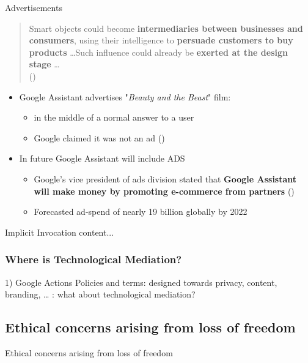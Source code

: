 \documentclass{beamer}
\begin{document}
\begin{frame}[allowframebreaks]
\begin{block}{Advertisements}
	\bigskip
	\begin{quote}
		Smart objects could become
\textbf{intermediaries between businesses and consumers}, using their intelligence to \textbf{persuade customers to buy products} \dots Such influence could
already be \textbf{exerted at the design stage} \dots\\(\cite{brey2005freedom})
	\end{quote}

	\begin{itemize}
		\item Google Assistant advertises "\emph{Beauty and the Beast}" film:
			\begin{itemize}
				\item in the middle of a normal answer to a user
				\item Google claimed it was not an ad (\cite{androidPolice})
			\end{itemize}
		\item In future Google Assistant will include ADS
			\begin{itemize}
				\item Google’s vice president of ads division stated that \textbf{Google Assistant will make money by promoting e-commerce from partners} (\cite{recode})
				\item Forecasted ad-spend of nearly 19 billion globally by 2022
			\end{itemize}
			
	\end{itemize}

	
\end{block}
\framebreak

\begin{block}{Implicit Invocation}
	content...
\end{block}
\end{frame}

\begin{frame}
\frametitle{Where is Technological Mediation? }
1) Google Actions Policies and terms: designed towards privacy, content, branding, … : what about technological mediation?
\end{frame}

\subsection{Ethical concerns arising from loss of freedom}
\begin{frame}
\begin{center} 
	 Ethical concerns arising from loss of freedom
\end{center}
\end{frame}
\end{document}
